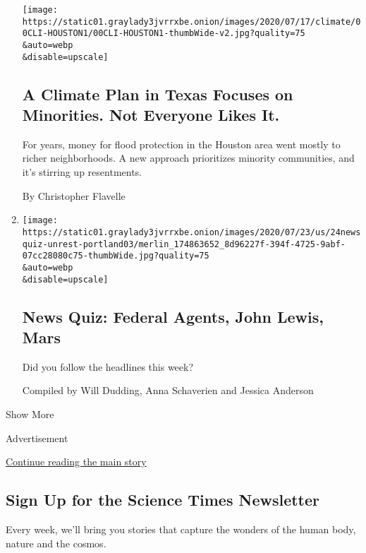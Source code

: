 \begin{enumerate}
  \texttt{[image: https://static01.graylady3jvrrxbe.onion/images/2020/07/17/climate/00CLI-HOUSTON1/00CLI-HOUSTON1-thumbWide-v2.jpg?quality=75\\\&auto=webp\\\&disable=upscale]}

  \hypertarget{a-climate-plan-in-texas-focuses-on-minorities-not-everyone-likes-it}{%
  \subsection{A Climate Plan in Texas Focuses on Minorities. Not
  Everyone Likes
  It.}\label{a-climate-plan-in-texas-focuses-on-minorities-not-everyone-likes-it}}

  For years, money for flood protection in the Houston area went mostly
  to richer neighborhoods. A new approach prioritizes minority
  communities, and it's stirring up resentments.

  By Christopher Flavelle
\item
  \href{/interactive/2020/07/24/briefing/federal-agents-john-lewis-mars-news-quiz.html}{}

  \texttt{[image: https://static01.graylady3jvrrxbe.onion/images/2020/07/23/us/24newsquiz-unrest-portland03/merlin\_174863652\_8d96227f-394f-4725-9abf-07cc28080c75-thumbWide.jpg?quality=75\\\&auto=webp\\\&disable=upscale]}

  \hypertarget{news-quiz-federal-agents-john-lewis-mars}{%
  \subsection{News Quiz: Federal Agents, John Lewis,
  Mars}\label{news-quiz-federal-agents-john-lewis-mars}}

  Did you follow the headlines this week?

  Compiled by Will Dudding, Anna Schaverien and Jessica Anderson
\end{enumerate}

Show More

Advertisement

\protect\hyperlink{after-mid2}{Continue reading the main story}

\hypertarget{sign-up-for-the-science-times-newsletter}{%
\subsection{Sign Up for the Science Times
Newsletter}\label{sign-up-for-the-science-times-newsletter}}

Every week, we'll bring you stories that capture the wonders of the
human body, nature and the cosmos.

